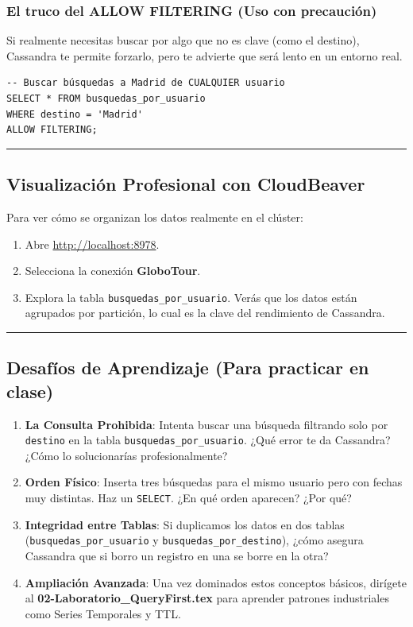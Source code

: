 \documentclass[12pt,a4paper]{article}
\begin{document}
\subsubsection{El truco del ALLOW FILTERING (Uso con precaución)}
Si realmente necesitas buscar por algo que no es clave (como el destino), Cassandra te permite forzarlo, pero te advierte que será lento en un entorno real.

\begin{lstlisting}[language=CQL]
-- Buscar búsquedas a Madrid de CUALQUIER usuario
SELECT * FROM busquedas_por_usuario 
WHERE destino = 'Madrid' 
ALLOW FILTERING;
\end{lstlisting}

\begin{center}\rule{0.5\linewidth}{0.5pt}\end{center}

\subsection{Visualización Profesional con CloudBeaver}\label{visualizacion}
Para ver cómo se organizan los datos realmente en el clúster:
\begin{enumerate}
    \item Abre \url{http://localhost:8978}.
    \item Selecciona la conexión \textbf{GloboTour}.
    \item Explora la tabla \texttt{busquedas\_por\_usuario}. Verás que los datos están agrupados por partición, lo cual es la clave del rendimiento de Cassandra.
\end{enumerate}

\begin{center}\rule{0.5\linewidth}{0.5pt}\end{center}

\subsection{Desafíos de Aprendizaje (Para practicar en clase)}\label{desafuxedos-de-aprendizaje-para-practicar-en-clase}

\begin{enumerate}
    \item \textbf{La Consulta Prohibida}: Intenta buscar una búsqueda filtrando solo por \texttt{destino} en la tabla \texttt{busquedas\_por\_usuario}. ¿Qué error te da Cassandra? ¿Cómo lo solucionarías profesionalmente?
    \item \textbf{Orden Físico}: Inserta tres búsquedas para el mismo usuario pero con fechas muy distintas. Haz un \texttt{SELECT}. ¿En qué orden aparecen? ¿Por qué?
    \item \textbf{Integridad entre Tablas}: Si duplicamos los datos en dos tablas (\texttt{busquedas\_por\_usuario} y \texttt{busquedas\_por\_destino}), ¿cómo asegura Cassandra que si borro un registro en una se borre en la otra?
    \item \textbf{Ampliación Avanzada}: Una vez dominados estos conceptos básicos, dirígete al \textbf{02-Laboratorio\_QueryFirst.tex} para aprender patrones industriales como Series Temporales y TTL.
\end{enumerate}
\end{document}
